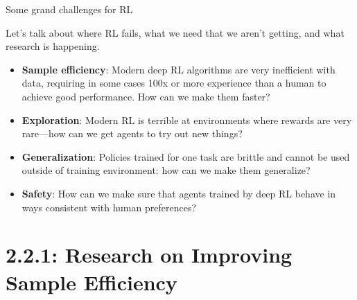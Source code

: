 \documentclass[9pt]{beamer}
\begin{document}
\begin{frame}{Some grand challenges for RL}

Let's talk about where RL fails, what we need that we aren't getting, and what research is happening.

\begin{itemize}
\item \textbf{Sample efficiency}: Modern deep RL algorithms are very inefficient with data, requiring in some cases 100x or more experience than a human to achieve good performance. How can we make them faster?
\pause
\item \textbf{Exploration}: Modern RL is terrible at environments where rewards are very rare---how can we get agents to try out new things?
\pause
\item \textbf{Generalization}: Policies trained for one task are brittle and cannot be used outside of training environment: how can we make them generalize?
\pause
\item \textbf{Safety}: How can we make sure that agents trained by deep RL behave in ways consistent with human preferences?
\end{itemize}

\end{frame}

\section{2.2.1: Research on Improving Sample Efficiency}
\end{document}
